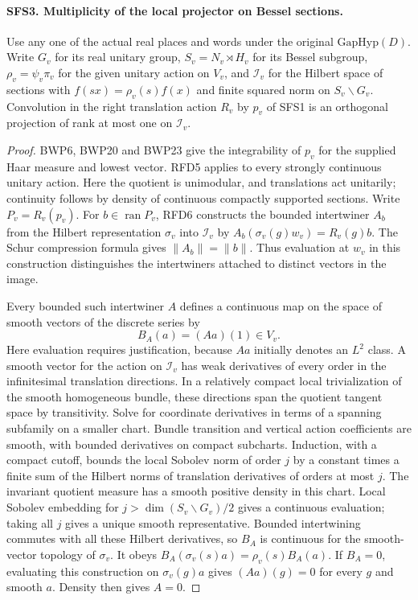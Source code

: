 \paragraph{SFS3. Multiplicity of the local projector on Bessel sections.}
\label{claim:SFS3}
Use any one of the actual real places and words under the original
$\mathrm{GapHyp}(D)$. Write $G_v$ for its real unitary group,
$S_v=N_v\rtimes H_v$ for its Bessel subgroup,
$\rho_v=\psi_v\pi_v$ for the given unitary action on $V_v$,
and $\mathcal I_v$ for the Hilbert space of sections with
$f(sx)=\rho_v(s)f(x)$ and finite squared norm on $S_v\backslash G_v$.
Convolution in the right translation action $R_v$ by $p_v$ of
SFS1 is an orthogonal projection of rank at most one on
$\mathcal I_v$.

\begin{proof}
BWP6, BWP20 and BWP23 give the integrability of $p_v$ for the
supplied Haar measure and lowest vector. RFD5 applies to every
strongly continuous unitary action. Here the quotient is unimodular,
and translations act unitarily; continuity follows by density of
continuous compactly supported sections. Write $P_v=R_v(p_v)$.
For $b\in\operatorname{ran}P_v$, RFD6 constructs the bounded
intertwiner $A_b$ from the Hilbert representation $\sigma_v$ into
$\mathcal I_v$ by $A_b(\sigma_v(g)w_v)=R_v(g)b$. The Schur
compression formula gives $\|A_b\|=\|b\|$. Thus evaluation at
$w_v$ in this construction distinguishes the intertwiners attached
to distinct vectors in the image.

Every bounded such intertwiner $A$ defines a continuous map on
the space of smooth vectors of the discrete series by
\[
                     B_A(a)=(Aa)(1)\in V_v.
\]
Here evaluation requires justification, because $Aa$ initially
denotes an $L^2$ class. A smooth vector for the action on
$\mathcal I_v$ has weak derivatives of every order in the
infinitesimal translation directions. In a relatively compact
local trivialization of the smooth homogeneous bundle, these
directions span the quotient tangent space by transitivity.
Solve for coordinate derivatives in terms of a spanning subfamily
on a smaller chart. Bundle transition and vertical action
coefficients are smooth, with bounded derivatives on compact
subcharts. Induction, with a compact cutoff, bounds the local
Sobolev norm of order $j$ by a constant times a finite sum of the
Hilbert norms of translation derivatives of orders at most $j$.
The invariant quotient measure has a smooth positive density in
this chart. Local Sobolev embedding for $j>\dim(S_v\backslash
G_v)/2$ gives a continuous evaluation; taking all $j$ gives a
unique smooth representative. Bounded intertwining commutes
with all these Hilbert derivatives, so $B_A$ is continuous for
the smooth-vector topology of $\sigma_v$. It obeys
$B_A(\sigma_v(s)a)=\rho_v(s)B_A(a)$. If $B_A=0$, evaluating
this construction on $\sigma_v(g)a$ gives $(Aa)(g)=0$ for
every $g$ and smooth $a$. Density then gives $A=0$.


\end{proof}
